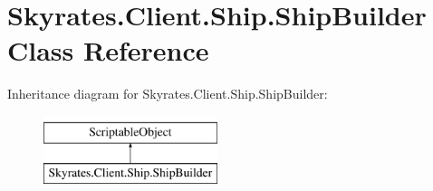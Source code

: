 \hypertarget{class_skyrates_1_1_client_1_1_ship_1_1_ship_builder}{\section{Skyrates.\-Client.\-Ship.\-Ship\-Builder Class Reference}
\label{class_skyrates_1_1_client_1_1_ship_1_1_ship_builder}
}
Inheritance diagram for Skyrates.\-Client.\-Ship.\-Ship\-Builder\-:\begin{figure}[H]
\begin{center}
\leavevmode
\includegraphics[height=2.000000cm]{class_skyrates_1_1_client_1_1_ship_1_1_ship_builder}
\end{center}
\end{figure}
